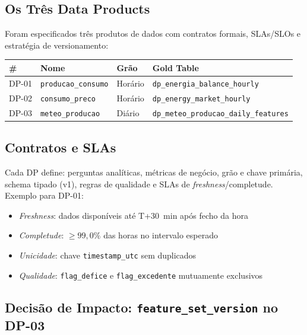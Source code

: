 \documentclass[11pt,a4paper]{article}
\begin{document}
\subsection{Os Três Data Products}

Foram especificados três produtos de dados com contratos formais, SLAs/SLOs e estratégia de versionamento:

\begin{table}[h!]
\centering
\begin{tabularx}{\linewidth}{lllX}
\toprule
\textbf{\#} & \textbf{Nome} & \textbf{Grão} & \textbf{Gold Table} \\
\midrule
DP-01 & \texttt{producao\_consumo} & Horário & \texttt{dp\_energia\_balance\_hourly} \\
DP-02 & \texttt{consumo\_preco} & Horário & \texttt{dp\_energy\_market\_hourly} \\
DP-03 & \texttt{meteo\_producao} & Diário & \texttt{dp\_meteo\_producao\_daily\_features} \\
\bottomrule
\end{tabularx}
\end{table}

\subsection{Contratos e SLAs}

Cada DP define: perguntas analíticas, métricas de negócio, grão e chave primária, schema tipado (v1), regras de qualidade e SLAs de \textit{freshness}/completude. Exemplo para DP-01:

\begin{itemize}[leftmargin=*,noitemsep]
  \item \textit{Freshness}: dados disponíveis até T+30~min após fecho da hora
  \item \textit{Completude}: $\geq 99{,}0\%$ das horas no intervalo esperado
  \item \textit{Unicidade}: chave \texttt{timestamp\_utc} sem duplicados
  \item \textit{Qualidade}: \texttt{flag\_defice} e \texttt{flag\_excedente} mutuamente exclusivos
\end{itemize}

\subsection{Decisão de Impacto: \texttt{feature\_set\_version} no DP-03}
\end{document}
